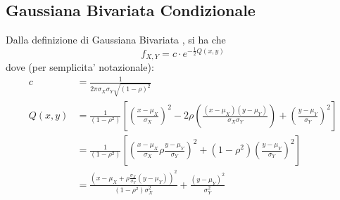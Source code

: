\documentclass{homework}
\begin{document}
\newpage

\begin{appendices}
\section{Gaussiana Bivariata Condizionale \cite{course:math2715}} \label{appendix:a}
Dalla definizione di Gaussiana Bivariata \cite{wiki:bivariate}, si ha che
\[
f_{X, Y} = c \cdot e^{-\frac{1}{2} Q(x, y)}
\]
dove (per semplicita' notazionale):
\[
\begin{split}
    c &=  \frac{1}{2 \pi \sigma_X \sigma_Y \sqrt{(1 - \rho)^2}} \\[2ex]
Q(x, y) &= \frac{1}{(1-\rho^2)} \left[  \left( \frac{x - \mu_X}{\sigma_X} \right)^2 - 2 \rho \left( \frac{(x - \mu_X)(y - \mu_Y)}{\sigma_X \sigma_Y} \right) + \left( \frac{y - \mu_Y}{\sigma_Y} \right)^2 \right]\\
 &=  \frac{1}{(1-\rho^2)} \left[  \left( \frac{x - \mu_X}{\sigma_X} \rho  \frac{y - \mu_Y}{\sigma_Y} \right)^2 + (1 - \rho^2) \left( \frac{y - \mu_Y}{\sigma_Y} \right)^2 \right]\\[2ex]
&=  \frac{ \left(x - \mu_X + \rho \frac{\sigma_X}{\sigma_Y}(y - \mu_Y) \right)^2}{(1-\rho^2)\sigma_X^2} + \frac{(y - \mu_Y)^2}{\sigma_Y^2}
\end{split}
\]



\end{appendices}
\end{document}
